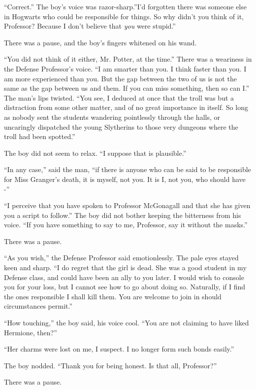 ``Correct.'' The boy's voice was razor-sharp.''I'd forgotten there was
someone else in Hogwarts who could be responsible for things. So why
didn't you think of it, Professor? Because I don't believe that
\emph{you} were stupid.''

There was a pause, and the boy's fingers whitened on his wand.

``You did not think of it either, Mr. Potter, at the time.'' There was a
weariness in the Defense Professor's voice. ``I am smarter than you. I
think faster than you. I am more experienced than you. But the gap
between the two of us is not the same as the gap between us and them. If
you can miss something, then so can I.'' The man's lips twisted. ``You
see, I deduced at once that the troll was but a distraction from some
other matter, and of no great importance in itself. So long as nobody
sent the students wandering pointlessly through the halls, or uncaringly
dispatched the young Slytherins to those very dungeons where the troll
had been spotted.''

The boy did not seem to relax. ``I suppose that is plausible.''

``In any case,'' said the man, ``if there is anyone who can be said to
be responsible for Miss Granger's death, it is myself, not you. It is I,
not you, who should have -''

``I perceive that you have spoken to Professor McGonagall and that she
has given you a script to follow.'' The boy did not bother keeping the
bitterness from his voice. ``If you have something to say to me,
Professor, say it without the masks.''

There was a pause.

``As you wish,'' the Defense Professor said emotionlessly. The pale eyes
stayed keen and sharp. ``I do regret that the girl is dead. She was a
good student in my Defense class, and could have been an ally to you
later. I would wish to console you for your loss, but I cannot see how
to go about doing so. Naturally, if I find the ones responsible I shall
kill them. You are welcome to join in should circumstances permit.''

``How touching,'' the boy said, his voice cool. ``You are not claiming
to have liked Hermione, then?''

``Her charms were lost on me, I suspect. I no longer form such bonds
easily.''

The boy nodded. ``Thank you for being honest. Is that all, Professor?''

There was a pause.

